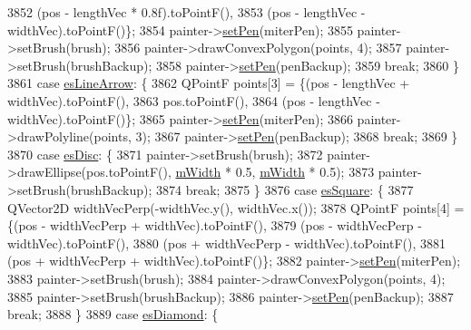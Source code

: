 \begin{DoxyCode}
3852                          (pos - lengthVec * 0.8f).toPointF(),
3853                          (pos - lengthVec - widthVec).toPointF()\};
3854     painter->\hyperlink{class_q_c_p_painter_af9c7a4cd1791403901f8c5b82a150195}{setPen}(miterPen);
3855     painter->setBrush(brush);
3856     painter->drawConvexPolygon(points, 4);
3857     painter->setBrush(brushBackup);
3858     painter->\hyperlink{class_q_c_p_painter_af9c7a4cd1791403901f8c5b82a150195}{setPen}(penBackup);
3859     \textcolor{keywordflow}{break};
3860   \}
3861   \textcolor{keywordflow}{case} \hyperlink{class_q_c_p_line_ending_a5ef16e6876b4b74959c7261d8d4c2cd5a61f78ee8f375fb21cb9d250687bbcbd2}{esLineArrow}: \{
3862     QPointF points[3] = \{(pos - lengthVec + widthVec).toPointF(),
3863                          pos.toPointF(),
3864                          (pos - lengthVec - widthVec).toPointF()\};
3865     painter->\hyperlink{class_q_c_p_painter_af9c7a4cd1791403901f8c5b82a150195}{setPen}(miterPen);
3866     painter->drawPolyline(points, 3);
3867     painter->\hyperlink{class_q_c_p_painter_af9c7a4cd1791403901f8c5b82a150195}{setPen}(penBackup);
3868     \textcolor{keywordflow}{break};
3869   \}
3870   \textcolor{keywordflow}{case} \hyperlink{class_q_c_p_line_ending_a5ef16e6876b4b74959c7261d8d4c2cd5ae5a3414916817258bcc6dddd605e8f5c}{esDisc}: \{
3871     painter->setBrush(brush);
3872     painter->drawEllipse(pos.toPointF(), \hyperlink{class_q_c_p_line_ending_aca89d21341133c20dc6825c33a5eac48}{mWidth} * 0.5, \hyperlink{class_q_c_p_line_ending_aca89d21341133c20dc6825c33a5eac48}{mWidth} * 0.5);
3873     painter->setBrush(brushBackup);
3874     \textcolor{keywordflow}{break};
3875   \}
3876   \textcolor{keywordflow}{case} \hyperlink{class_q_c_p_line_ending_a5ef16e6876b4b74959c7261d8d4c2cd5ae1836502fa43d8990bb62b2d493a140a}{esSquare}: \{
3877     QVector2D widthVecPerp(-widthVec.y(), widthVec.x());
3878     QPointF points[4] = \{(pos - widthVecPerp + widthVec).toPointF(),
3879                          (pos - widthVecPerp - widthVec).toPointF(),
3880                          (pos + widthVecPerp - widthVec).toPointF(),
3881                          (pos + widthVecPerp + widthVec).toPointF()\};
3882     painter->\hyperlink{class_q_c_p_painter_af9c7a4cd1791403901f8c5b82a150195}{setPen}(miterPen);
3883     painter->setBrush(brush);
3884     painter->drawConvexPolygon(points, 4);
3885     painter->setBrush(brushBackup);
3886     painter->\hyperlink{class_q_c_p_painter_af9c7a4cd1791403901f8c5b82a150195}{setPen}(penBackup);
3887     \textcolor{keywordflow}{break};
3888   \}
3889   \textcolor{keywordflow}{case} \hyperlink{class_q_c_p_line_ending_a5ef16e6876b4b74959c7261d8d4c2cd5a378fe5a8b768411b0bc1765210fe7200}{esDiamond}: \{

\end{DoxyCode}
